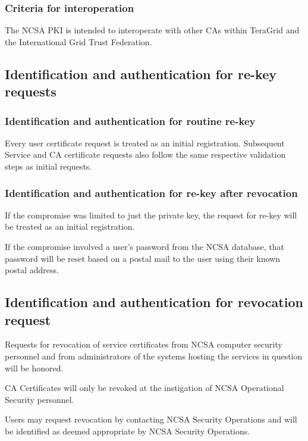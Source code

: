 \documentclass[10pt]{article}
\begin{document}
\subsubsection{Criteria for interoperation}

The NCSA PKI is intended to interoperate with other CAs within
TeraGrid and the International Grid Trust Federation.

\subsection{Identification and authentication for re-key requests}

\subsubsection{Identification and authentication for routine re-key}

Every user certificate request is treated as an initial
registration. Subsequent Service and CA certificate requests also
follow the same respective validation steps as initial requests.

\subsubsection{Identification and authentication for re-key after revocation}

If the compromise was limited to just the private key, the request for
re-key will be treated as an initial registration.

If the compromise involved a user's password from the NCSA database,
that password will be reset based on a postal mail to the user using
their known postal address.

\subsection{Identification and authentication for revocation request}

Requests for revocation of service certificates from NCSA computer
security personnel and from administrators of the systems hosting the
services in question will be honored.

CA Certificates will only be revoked at the instigation of NCSA
Operational Security personnel.

Users may request revocation by contacting NCSA Security Operations
and will be identified as deemed appropriate by NCSA Security
Operations.
\end{document}
